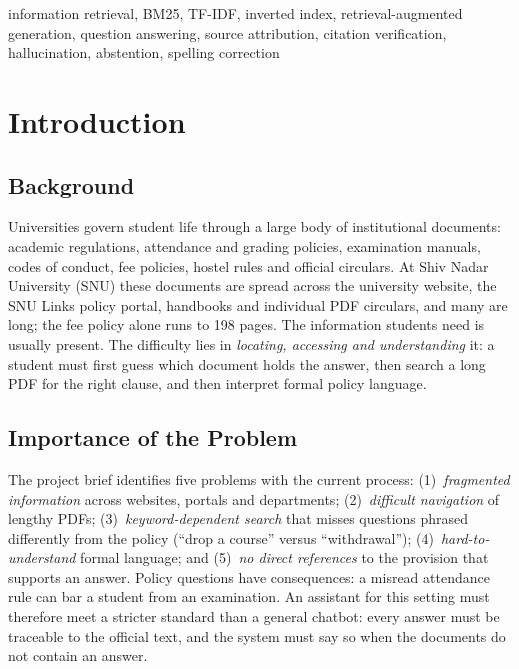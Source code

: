 \documentclass[conference]{IEEEtran}
\begin{document}
\begin{IEEEkeywords}
information retrieval, BM25, TF-IDF, inverted index, retrieval-augmented generation, question answering, source attribution, citation verification, hallucination, abstention, spelling correction
\end{IEEEkeywords}

\section{Introduction}

\subsection{Background}
Universities govern student life through a large body of institutional documents: academic regulations, attendance and grading policies, examination manuals, codes of conduct, fee policies, hostel rules and official circulars. At Shiv Nadar University (SNU) these documents are spread across the university website, the SNU Links policy portal, handbooks and individual PDF circulars, and many are long; the fee policy alone runs to 198 pages. The information students need is usually present. The difficulty lies in \emph{locating, accessing and understanding} it: a student must first guess which document holds the answer, then search a long PDF for the right clause, and then interpret formal policy language.

\subsection{Importance of the Problem}
The project brief identifies five problems with the current process: (1)~\emph{fragmented information} across websites, portals and departments; (2)~\emph{difficult navigation} of lengthy PDFs; (3)~\emph{keyword-dependent search} that misses questions phrased differently from the policy (``drop a course'' versus ``withdrawal''); (4)~\emph{hard-to-understand} formal language; and (5)~\emph{no direct references} to the provision that supports an answer. Policy questions have consequences: a misread attendance rule can bar a student from an examination. An assistant for this setting must therefore meet a stricter standard than a general chatbot: every answer must be traceable to the official text, and the system must say so when the documents do not contain an answer.
\end{document}
